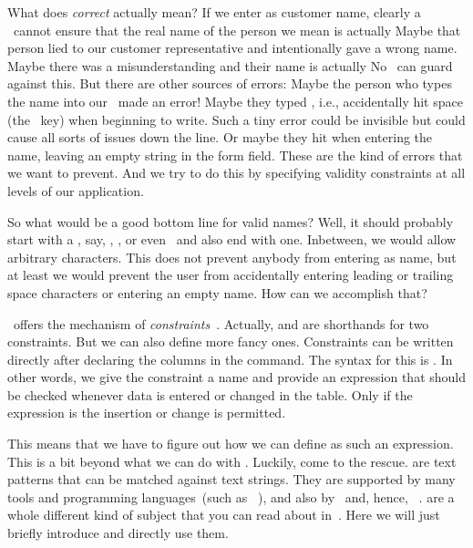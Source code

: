 What does \emph{correct} actually mean?
If we enter  as customer name, clearly a \dbms\ cannot ensure that the real name of the person we mean is actually 
Maybe that  person lied to our customer representative and intentionally gave a wrong name.
Maybe there was a misunderstanding and their name is actually 
No \dbms\ can guard against this.
But there are other sources of errors:
Maybe the person who types the name into our \dbms\ made an error!
Maybe they typed , i.e., accidentally hit space (the \keys{\space}~key) when beginning to write.
Such a tiny error could be invisible but could cause all sorts of issues down the line.
Or maybe they hit \keys{\tab} when entering the name, leaving an empty string in the form field.
These are the kind of errors that we want to prevent.
And we try to do this by specifying validity constraints at all levels of our application.

So what would be a good bottom line for valid names?
Well, it should probably start with a , say, , , or even~ and also end with one.
Inbetween, we would allow arbitrary characters.
This does not prevent anybody from entering  as name, but at least we would prevent the user from accidentally entering leading or trailing space characters or entering an empty name.
How can we accomplish that?%
%
\begin{sloppypar}%
\sql\ offers the mechanism of \emph{constraints}~\cite{PGDG:PD:C}.
Actually,  and  are shorthands for two constraints.
But we can also define more fancy ones.
Constraints can be written directly after declaring the columns in the  command.
The syntax for this is .
In other words, we give the constraint a name and provide an expression that should be checked whenever data is entered or changed in the table.
Only if the expression is  the insertion or change is permitted.%
\end{sloppypar}%
%
%
%
%
This means that we have to figure out how we can define  as such an expression.
This is a bit beyond what we can do with .
Luckily,  come to the rescue.
 are text patterns that can be matched against text strings.
They are supported by many tools and programming languages~(such as \python~\cite{programmingWithPython}), and also by \sql\ and, hence, \postgresql~\cite{PGDG:PD:PRE}.
 are a whole different kind of subject that you can read about in~\cite{PGDG:PD:PRE}.
Here we will just briefly introduce and directly use them.


